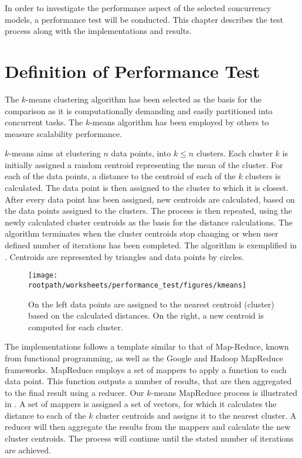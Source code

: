 \makeatletter {}\makeatother
{}
%
In order to investigate the performance aspect of the selected concurrency models, a performance test will be conducted.  This chapter describes the test process along with the implementations and results. 
\label{chap:performance}
\section{Definition of Performance Test}
\label{sec:test_approach}
The $k$-means clustering algorithm has been selected as the basis for the comparison as it is computationally demanding and easily partitioned into concurrent tasks\cite[p. 128]{epstein2011towards}. The $k$-means algorithm has been employed by others to measure scalability performance\cite{epstein2011towards}\cite{tardieu2014x10}.

$k$-means aims at clustering $n$ data points, into $k \leq n$ clusters\cite[p. 451]{dataminingconceptsandtechniques}\cite[p. 128]{epstein2011towards}. Each cluster $k$ is initially assigned a random centroid representing the mean of the cluster. For each of the data points, a distance to the centroid of each of the $k$ clusters is calculated. The data point is then assigned to the cluster to which it is closest. After every data point has been assigned, new centroids are calculated, based on the data points assigned to the clusters. The process is then repeated, using the newly calculated cluster centroids as the basis for the distance calculations. The algorithm terminates when the cluster centroids stop changing or when user defined number of iterations has been completed\cite[p. 128]{epstein2011towards}. The algorithm is exemplified in . Centroids are represented by triangles and data points by circles.

\begin{figure}[ht!]
\centering
\texttt{[image: \\rootpath/worksheets/performance\_test/figures/kmeans]}
\caption{On the left data points are assigned to the nearest centroid (cluster) based on the calculated distances. On the right, a new centroid is computed for each cluster.}\label{fig:kmeans}
\end{figure}

The implementations follows a template similar to that of Map-Reduce\cite{dean2008mapreduce}, known from functional programming, as well as the Google and Hadoop MapReduce frameworks. MapReduce employs a set of mappers to apply a function to each data point. This function outputs a number of results, that are then aggregated to the final result using a reducer. Our $k$-means MapReduce process is illustrated in . A set of mappers is assigned a set of vectors, for which it calculates the distance to each of the $k$ cluster centroids and assigns it to the nearest cluster. A reducer will then aggregate the results from the mappers and calculate the new cluster centroids. The process will continue until the stated number of iterations are achieved.

